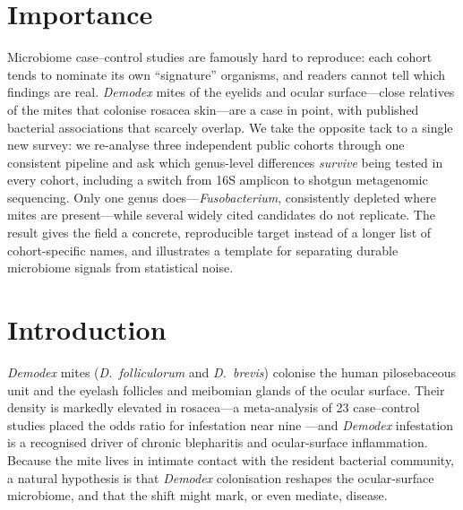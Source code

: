\documentclass[11pt]{article}
\newcommand{\demodex}{\textit{Demodex}}
\begin{document}
\section*{Importance}
Microbiome case--control studies are famously hard to reproduce: each cohort
tends to nominate its own ``signature'' organisms, and readers cannot tell which
findings are real. \demodex{} mites of the eyelids and ocular surface---close
relatives of the mites that colonise rosacea skin---are a case in point, with
published bacterial associations that scarcely overlap. We take the opposite tack
to a single new survey: we re-analyse three independent public cohorts through one
consistent pipeline and ask which genus-level differences \emph{survive} being
tested in every cohort, including a switch from 16S amplicon to shotgun
metagenomic sequencing. Only one genus does---\textit{Fusobacterium}, consistently
depleted where mites are present---while several widely cited candidates do not
replicate. The result gives the field a concrete, reproducible target instead of a
longer list of cohort-specific names, and illustrates a template for separating
durable microbiome signals from statistical noise.

\section{Introduction}

\demodex{} mites (\textit{D.\ folliculorum} and \textit{D.\ brevis}) colonise the
human pilosebaceous unit and the eyelash follicles and meibomian glands of the
ocular surface. Their density is markedly elevated in rosacea---a meta-analysis of
23 case--control studies placed the odds ratio for infestation near nine
\citep{chang2017}---and \demodex{} infestation is a recognised driver of chronic
blepharitis and ocular-surface inflammation. Because the mite lives in intimate
contact with the resident bacterial community, a natural hypothesis is that
\demodex{} colonisation reshapes the ocular-surface microbiome, and that the shift
might mark, or even mediate, disease.
\end{document}
